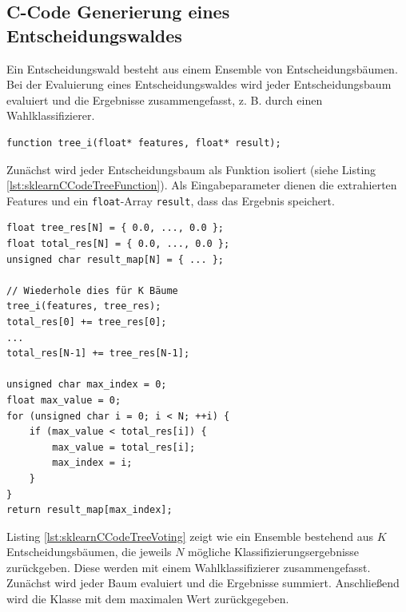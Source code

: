\subsection{C-Code Generierung eines Entscheidungswaldes}
Ein Entscheidungswald besteht aus einem Ensemble von Entscheidungsbäumen. Bei der Evaluierung eines Entscheidungswaldes wird jeder Entscheidungsbaum evaluiert und die Ergebnisse zusammengefasst, z. B.
durch einen Wahlklassifizierer.
\begin{lstlisting}[label=lst:sklearnCCodeTreeFunction,caption={C-Code Funktionskopf eines Baumes $i$.}]
function tree_i(float* features, float* result);
\end{lstlisting}
Zunächst wird jeder Entscheidungsbaum als Funktion isoliert (siehe Listing \ref{lst:sklearnCCodeTreeFunction}). Als Eingabeparameter dienen die extrahierten Features und ein \texttt{float}-Array \texttt{result}, dass das
Ergebnis speichert.
\begin{lstlisting}[label=lst:sklearnCCodeTreeVoting,caption={C-Code des Wahlklassifizierers mit $N$ Klassen und $K$ Bäumen.}]
float tree_res[N] = { 0.0, ..., 0.0 };
float total_res[N] = { 0.0, ..., 0.0 };
unsigned char result_map[N] = { ... };

// Wiederhole dies für K Bäume
tree_i(features, tree_res);
total_res[0] += tree_res[0];
...
total_res[N-1] += tree_res[N-1];

unsigned char max_index = 0;
float max_value = 0;
for (unsigned char i = 0; i < N; ++i) {
    if (max_value < total_res[i]) {
        max_value = total_res[i];
        max_index = i;
    }
}
return result_map[max_index];
\end{lstlisting}
Listing \ref{lst:sklearnCCodeTreeVoting} zeigt wie ein Ensemble bestehend aus $K$ Entscheidungsbäumen, die jeweils $N$ mögliche Klassifizierungsergebnisse zurückgeben. Diese werden mit einem Wahlklassifizierer
zusammengefasst. Zunächst wird jeder Baum evaluiert und die Ergebnisse summiert. Anschließend wird die Klasse mit dem maximalen Wert zurückgegeben.